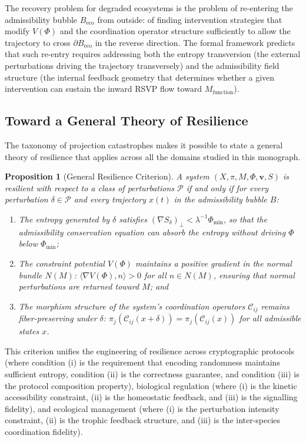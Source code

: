 \documentclass[12pt, a4paper]{article}
\theoremstyle{essaystyle}
\newtheorem{proposition}{Proposition}
\begin{document}
The recovery problem for degraded ecosystems is the problem of re-entering the
admissibility bubble $B_{\mathrm{eco}}$ from outside: of finding intervention
strategies that modify $V(\Phi)$ and the coordination operator structure sufficiently
to allow the trajectory to cross $\partial B_{\mathrm{eco}}$ in the reverse direction.
The formal framework predicts that such re-entry requires addressing both the entropy
transversion (the external perturbations driving the trajectory transversely) and
the admissibility field structure (the internal feedback geometry that determines
whether a given intervention can sustain the inward RSVP flow toward $M_{\mathrm{function}}$).

\subsection{Toward a General Theory of Resilience}

The taxonomy of projection catastrophes makes it possible to state a general theory
of resilience that applies across all the domains studied in this monograph.

\begin{proposition}[General Resilience Criterion]
A system $(X, \pi, M, \Phi, \mathbf{v}, S)$ is resilient with respect to a class
of perturbations $\mathcal{P}$ if and only if for every perturbation $\delta \in \mathcal{P}$
and every trajectory $x(t)$ in the admissibility bubble $B$:
\begin{enumerate}
\item[(i)] The entropy generated by $\delta$ satisfies $(\nabla S_\delta)_\perp < \lambda^{-1}
\Phi_{\min}$, so that the admissibility conservation equation can absorb the entropy
without driving $\Phi$ below $\Phi_{\min}$;
\item[(ii)] The constraint potential $V(\Phi)$ maintains a positive gradient in the normal
bundle $N(M)$: $\langle \nabla V(\Phi), n \rangle > 0$ for all $n \in N(M)$,
ensuring that normal perturbations are returned toward $M$; and
\item[(iii)] The morphism structure of the system's coordination operators $\mathcal{C}_{ij}$
remains fiber-preserving under $\delta$: $\pi_j(\mathcal{C}_{ij}(x + \delta)) =
\pi_j(\mathcal{C}_{ij}(x))$ for all admissible states $x$.
\end{enumerate}
\end{proposition}

This criterion unifies the engineering of resilience across cryptographic protocols
(where condition (i) is the requirement that encoding randomness maintains sufficient
entropy, condition (ii) is the correctness guarantee, and condition (iii) is the
protocol composition property), biological regulation (where (i) is the kinetic
accessibility constraint, (ii) is the homeostatic feedback, and (iii) is the
signalling fidelity), and ecological management (where (i) is the perturbation
intensity constraint, (ii) is the trophic feedback structure, and (iii) is the
inter-species coordination fidelity).
\end{document}
